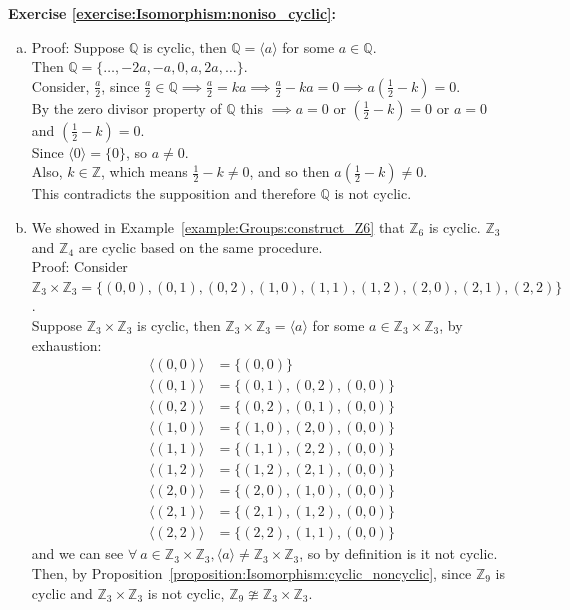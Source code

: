 \noindent\textbf{Exercise \ref{exercise:Isomorphism:noniso_cyclic}:}
\begin{enumerate}[(a)]
\item
Proof: Suppose ${\mathbb Q}$ is cyclic, then ${\mathbb Q} = \langle a \rangle$ for some $a \in {\mathbb Q}$.
\\
Then ${\mathbb Q} = \{ \dotsc , -2a, -a, 0, a, 2a, \dotsc\}$.
\\
Consider, $\frac{a}{2}$, since $\frac{a}{2} \in {\mathbb Q} \implies \frac{a}{2} = ka \implies \frac{a}{2} - ka = 0 \implies a(\frac{1}{2} - k) = 0$.
\\
By the zero divisor property of ${\mathbb Q}$ this $\implies a = 0$ or $(\frac{1}{2} - k) = 0$ or $a = 0$ and $(\frac{1}{2} - k) = 0$.
\\
Since $\langle 0 \rangle = \{0\}$, so $a \neq 0$.
\\
Also, $k \in {\mathbb Z}$, which means $\frac{1}{2} - k \neq 0$, and so then $a(\frac{1}{2} - k) \neq 0$.
\\
This contradicts the supposition and therefore ${\mathbb Q}$ is not cyclic.

\item
We showed in Example~\ref{example:Groups:construct_Z6} that ${\mathbb Z}_6$ is cyclic.  ${\mathbb Z}_3$ and ${\mathbb Z}_4$ are cyclic based on the same procedure.
\\
Proof: Consider ${\mathbb Z}_3 \times {\mathbb Z}_3 = \{(0, 0), (0, 1), (0, 2), (1, 0), (1, 1), (1, 2), (2, 0), (2, 1), (2,2)\}$.
\\
Suppose  ${\mathbb Z}_3 \times {\mathbb Z}_3$ is cyclic, then ${\mathbb Z}_3 \times {\mathbb Z}_3 = \langle a \rangle$ for some $a \in {\mathbb Z}_3 \times {\mathbb Z}_3$, by exhaustion:
\begin{align*}
\langle(0, 0)\rangle &= \{(0, 0)\}
\\
\langle(0, 1)\rangle &= \{(0, 1), (0, 2), (0, 0)\}
\\
\langle(0, 2)\rangle &= \{(0, 2), (0, 1), (0, 0)\}
\\
\langle(1, 0)\rangle &= \{(1, 0), (2, 0), (0, 0)\}
\\
\langle(1, 1)\rangle &= \{(1, 1), (2,2), (0, 0)\}
\\
\langle(1, 2)\rangle &= \{(1, 2), (2, 1), (0, 0)\}
\\
\langle(2, 0)\rangle &= \{(2, 0), (1, 0), (0, 0)\}
\\
\langle(2, 1)\rangle &= \{(2, 1), (1, 2), (0, 0)\}
\\
\langle(2, 2)\rangle &= \{(2, 2), (1, 1), (0, 0)\}
\end{align*}
and we can see $\forall\ a \in {\mathbb Z}_3 \times {\mathbb Z}_3, \langle a \rangle \neq {\mathbb Z}_3 \times {\mathbb Z}_3$, so by definition is it not cyclic.
\\
Then, by Proposition~\ref{proposition:Isomorphism:cyclic_noncyclic}, since ${\mathbb Z}_9$ is cyclic and ${\mathbb Z}_3 \times {\mathbb Z}_3$ is not cyclic, ${\mathbb Z}_9 \ncong {\mathbb Z}_3 \times {\mathbb Z}_3$.


\end{enumerate}
